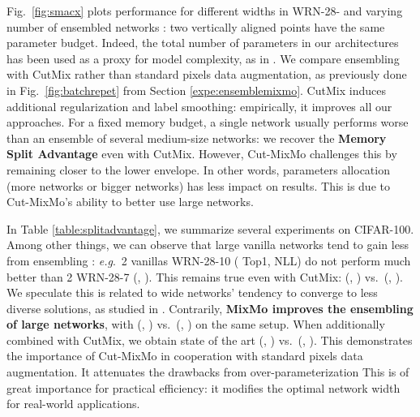 \documentclass[10pt,twocolumn,letterpaper]{article}
\begin{document}
\label{app:ensmixmo}
Fig.~\ref{fig:smacx} 
plots performance for different
widths  in WRN-28- and varying number of ensembled networks : two
vertically aligned points have the same parameter budget. Indeed, the total number of
parameters in our architectures has been used as a proxy for model complexity, as in \cite{chirkova2020deep,lobacheva2020power}. We compare
ensembling with CutMix rather than standard pixels data augmentation, as previously done in Fig.~\ref{fig:batchrepet} from Section \ref{expe:ensemblemixmo}. CutMix induces additional regularization and label smoothing: empirically, it improves all our approaches. For a
fixed memory budget, a single network usually performs worse than an ensemble of
several medium-size networks: we recover the \textbf{Memory Split Advantage} even with CutMix.
However, Cut-MixMo challenges this by remaining closer to the
lower envelope. In other words,
parameters allocation (more networks or bigger networks) has less impact on
results. This is due to Cut-MixMo's ability to better use large networks.

In Table \ref{table:splitadvantage}, we summarize several experiments on
CIFAR-100. Among other things, we can observe that large vanilla networks tend
to gain less from ensembling \cite{lobacheva2020power}: \textit{e.g}.\ 2
vanillas WRN-28-10 ( Top1,  NLL) do not perform much better
than 2 WRN-28-7 (, ). This remains true even with CutMix:
(, ) vs.\ (, ). We speculate this is related to
wide networks' tendency to converge to less diverse solutions, as studied in
\cite{neal2018modern}. Contrarily, \textbf{MixMo improves the ensembling of large networks}, with (, ) vs.\ (, ) on the same setup. When additionally combined with CutMix, we obtain state of the art
(, ) vs.\ (, ). 
This demonstrates the importance of Cut-MixMo in cooperation with standard pixels data augmentation.
It attenuates the drawbacks from over-parameterization
This is of great importance for practical efficiency: it modifies
the optimal network width for real-world applications.%
\end{document}
